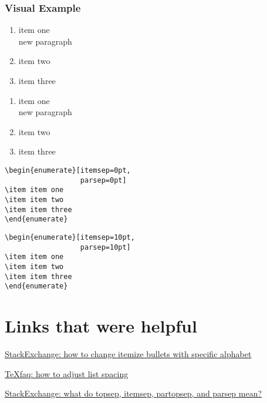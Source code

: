 \documentclass[12pt, letterpaper]{article}
\begin{document}
\subsubsection{Visual Example}
\begin{multicols}{2}
\begin{enumerate}[itemsep=0pt, parsep=0pt]
	\item item one\\
	new paragraph 
	\item item two
	\item item three
\end{enumerate} 
\columnbreak 
\begin{enumerate}[itemsep=10pt, parsep=10pt]
	\item item one\\
	new paragraph 
	\item item two
	\item item three
\end{enumerate} 
\end{multicols}
\begin{multicols}{2}
\begin{lstlisting}
\begin{enumerate}[itemsep=0pt,
                  parsep=0pt]
\item item one
\item item two
\item item three
\end{enumerate} 
\end{lstlisting}
	\columnbreak 
\begin{lstlisting}
\begin{enumerate}[itemsep=10pt, 
                  parsep=10pt]
\item item one
\item item two
\item item three
\end{enumerate} 
\end{lstlisting}
\end{multicols}


\section{Links that were helpful} 
\href{https://tex.stackexchange.com/questions/278877/how-to-change-itemize-bullets-with-specific-alphabet}{StackExchange: how to change itemize bullets with specific alphabet} 

\href{https://texfaq.org/FAQ-complist}{TeXfaq: how to adjust list spacing}

\href{https://tex.stackexchange.com/questions/300340/topsep-itemsep-partopsep-and-parsep-what-does-each-of-them-mean-and-wha}{StackExchange: what do topsep, itemsep, partopsep, and parsep mean?}
\end{document}
